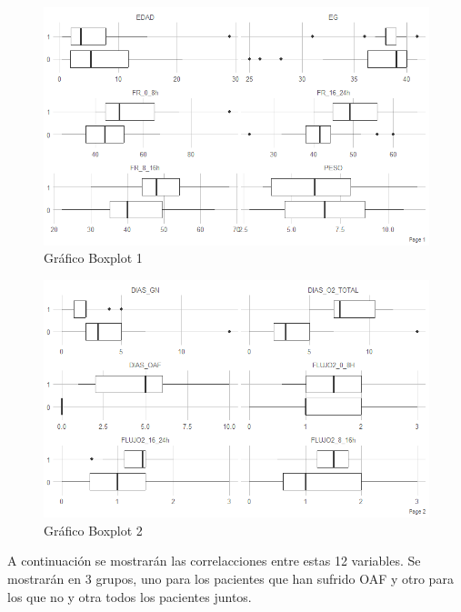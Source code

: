 \begin{figure}[H]
    \centering
    \includegraphics[scale = 0.85]{./img/boxplt1.png}
    \caption{Gráfico Boxplot 1}\label{fig:boxplt1}
\end{figure}

\begin{figure}[H]
    \centering
    \includegraphics[scale = 0.85]{./img/boxplt2.png}
    \caption{Gráfico Boxplot 2}\label{fig:boxplt2}
\end{figure}

A continuación se mostrarán las correlacciones entre estas 12 variables. Se mostrarán en $3$ grupos, uno para los pacientes que han sufrido OAF y otro para los que no y otra todos los pacientes juntos. 

